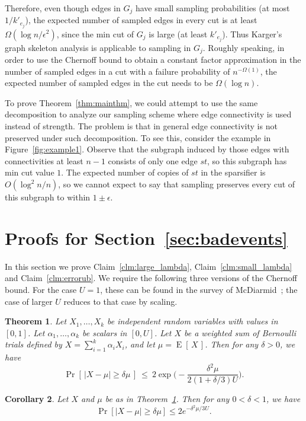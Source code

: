 \documentclass[11pt]{article}
\numberwithin{equation}{section}
\newtheorem{theorem}{Theorem}[section]
\newtheorem{corollary}[theorem]{Corollary}
\newcommand{\prob}[1]{\operatorname{Pr}\left[\,#1\,\right]}               \newcommand{\probg}[2]{\operatorname{Pr}\left[\,#1 \:\mid\: #2\,\right]}
\newcommand{\expect}[1]{\operatorname{E}\left[\,#1\,\right]}              \newcommand{\expectg}[2]{\operatorname{E}\left[\,#1 \,\mid\, #2\,\right]}
\newcommand{\AppendixName}[1]{\label{app:#1}}
\newcommand{\Claim}[1]{Claim~\ref{clm:#1}}
\newcommand{\CorollaryName}[1]{\label{cor:#1}}
\newcommand{\Figure}[1]{Figure~\ref{fig:#1}}
\newcommand{\Section}[1]{Section~\ref{sec:#1}}
\newcommand{\TheoremName}[1]{\label{thm:#1}}
\newcommand{\Theorem}[1]{Theorem~\ref{thm:#1}}
\begin{document}
Therefore, even though edges in $G_j$
have small sampling probabilities (at most $1/k'_{e_j}$), 
the expected number of sampled edges in every cut is 
at least $\Omega(\log n/\epsilon^2)$,
since the min cut of $G_j$ is large (at least $k'_{e_j}$).
Thus Karger's graph skeleton analysis is applicable to sampling in $G_j$.
Roughly speaking, in order to use the Chernoff bound 
to obtain a constant factor approximation
in the number of sampled edges in a cut
with a failure probability of $n^{-\Omega(1)}$,
the expected number of sampled edges in the cut needs to be $\Omega(\log n)$.

To prove \Theorem{mainthm}, we could attempt to use the same decomposition to 
analyze our sampling scheme where edge connectivity is used instead of strength.
The problem is that in general
edge connectivity is not preserved under such decomposition.
To see this, consider the example in \Figure{example1}.
Observe that the subgraph induced by those edges 
with connectivities at least $n-1$ 
consists of only one edge $st$, so this subgraph has min cut value $1$.
The expected number of copies of $st$ in the sparsifier is $O(\log^2 n/n)$,
so we cannot expect to say that sampling preserves every cut of this subgraph
to within $1\pm \epsilon$.



\section{Proofs for \Section{badevents}}
\AppendixName{boundproofs}

In this section we prove \Claim{large_lambda}, \Claim{small_lambda} and \Claim{errorub}.
We require the following three versions of the Chernoff bound.
For the case $U=1$, these can be found in the survey of McDiarmid~\cite{McDiarmid};
the case of larger $U$ reduces to that case by scaling.

\begin{theorem}
\TheoremName{chernoff_3}
Let $X_1,\ldots,X_k$ be independent random variables with values in $[0,1]$.
Let $\alpha_1,\ldots,\alpha_k$ be scalars in $[0,U]$.
Let $X$ be a weighted sum of Bernoulli trials defined by
$X=\sum_{i=1}^{k} \alpha_i X_i$, and let $\mu = \expect{X}$.
Then for any $\delta > 0$, we have
$$
    \prob{ |X-\mu|\ge \delta\mu} ~\le~ 2\exp\Bigg(- \frac{ \delta^2 \mu}{2(1+\delta/3)U} \Bigg).
$$
\end{theorem}


\begin{corollary}
\CorollaryName{chernoff_1}
Let $X$ and $\mu$ be as in \Theorem{chernoff_3}.
Then for any $0<\delta<1$, we have
$$
    \Pr[|X-\mu|\ge \delta\mu]\le 2e^{-\delta^2 \mu/3U}.
$$
\end{corollary}
\end{document}
